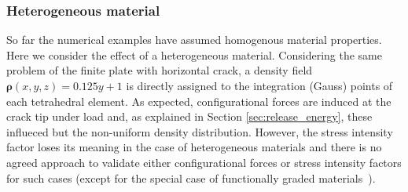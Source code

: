 \documentclass[review]{elsarticle}
\numberwithin{equation}{section}
\begin{document}
\subsubsection{Heterogeneous material}
So far the numerical examples have assumed homogenous material properties. Here we consider the effect of a heterogeneous material. 
Considering the same problem of the finite plate with horizontal crack, a density field $\mathbf{\rho}(x,y,z) = 0.125y + 1$ is directly assigned to the integration (Gauss) points of each tetrahedral element.
As expected, configurational forces are induced at the crack tip under load and, as explained in Section \ref{sec:release_energy}, these influeced but the non-uniform density distribution. 
However, the stress intensity factor loses its meaning in the case of heterogeneous materials and there is no agreed approach to validate either configurational forces or stress intensity factors for such cases (except for the special case of functionally graded materials~\citep{kim2002finite}).
\end{document}
